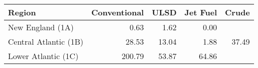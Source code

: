 \begin{tabular}{lrrrr}
  \hline
Region & Conventional & ULSD & Jet Fuel & Crude \\ 
  \hline
New England (1A) & 0.63 & 1.62 & 0.00 &  \\ 
  Central Atlantic (1B) & 28.53 & 13.04 & 1.88 & 37.49 \\ 
  Lower Atlantic (1C) & 200.79 & 53.87 & 64.86 &  \\ 
   \hline
\end{tabular}
